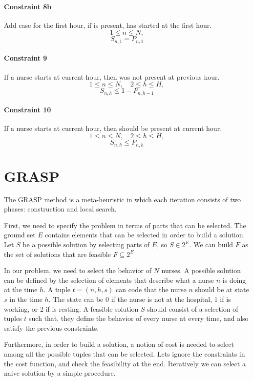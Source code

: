 \documentclass[12pt,a4paper]{article}
\begin{document}
\paragraph{Constraint 8b} Add case for the first hour, if is present, has 
started at the first hour.
$$ 1 \le n \le N,$$
$$ S_{n, 1} = P_{n, 1} $$
%
\paragraph{Constraint 9} If a nurse starts at current hour, then was not
present at previous hour.
$$ 1 \le  n \le N ,\quad 2 \le h \le H,$$
$$ S_{n,h} \le 1 - P_{n, h-1} $$
%
\paragraph{Constraint 10} If a nurse starts at current hour, then should be
present at current hour.
$$ 1 \le n \le N,\quad 2 \le h \le H,$$
$$ S_{n,h} \le P_{n, h} $$
%
%
\section{GRASP}
%
The GRASP method is a meta-heuristic in which each iteration consists of two 
phases: construction and local search.

First, we need to specify the problem in terms of parts that can be selected.  
The ground set $E$ contains elements that can be selected in order to build a 
solution. Let $S$ be a possible solution by selecting parts of $E$, so $S \in 
2^E$. We can build $F$ as the set of solutions that are feasible $F \subseteq 
2^E$

In our problem, we need to select the behavior of $N$ nurses. A possible 
solution can be defined by the selection of elements that describe what a nurse 
$n$ is doing at the time $h$. A tuple $t = (n, h, s)$ can code that the nurse 
$n$ should be at state $s$ in the time $h$. The state can be 0 if the nurse is 
not at the hospital, 1 if is working, or 2 if is resting. A feasible solution 
$S$ should consist of a selection of tuples $t$ such that, they define the 
behavior of every nurse at every time, and also satisfy the previous 
constraints.

Furthermore, in order to build a solution, a notion of cost is needed to select 
among all the possible tuples that can be selected. Lets ignore the constraints 
in the cost function, and check the feasibility at the end. Iteratively we can 
select a naive solution by a simple procedure.
\end{document}
